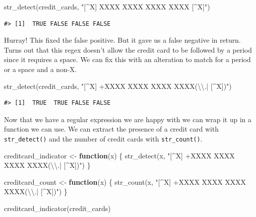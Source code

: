 \documentclass[
]{krantz}
\makeatletter
\newenvironment{Shaded}{\begin{snugshade}}{\end{snugshade}}
\newcommand{\ControlFlowTok}[1]{\textcolor[rgb]{0.13,0.29,0.53}{\textbf{#1}}}
\newcommand{\FunctionTok}[1]{\textcolor[rgb]{0.00,0.00,0.00}{#1}}
\newcommand{\NormalTok}[1]{#1}
\newcommand{\OtherTok}[1]{\textcolor[rgb]{0.56,0.35,0.01}{#1}}
\newcommand{\SpecialCharTok}[1]{\textcolor[rgb]{0.00,0.00,0.00}{#1}}
\newcommand{\StringTok}[1]{\textcolor[rgb]{0.31,0.60,0.02}{#1}}
\newenvironment{kframe}{%
\medskip{}
\setlength{\fboxsep}{.8em}
 \def\at@end@of@kframe{}%
 \ifinner\ifhmode%
  \def\at@end@of@kframe{\end{minipage}}%
  \begin{minipage}{\columnwidth}%
 \fi\fi%
 \def\FrameCommand##1{\hskip\@totalleftmargin \hskip-\fboxsep
 \colorbox{shadecolor}{##1}\hskip-\fboxsep
     \hskip-\linewidth \hskip-\@totalleftmargin \hskip\columnwidth}%
 \MakeFramed {\advance\hsize-\width
   \@totalleftmargin\z@ \linewidth\hsize
   \@setminipage}}%
 {\par\unskip\endMakeFramed%
 \at@end@of@kframe}
\renewenvironment{Shaded}{\begin{kframe}}{\end{kframe}}
\makeatother
\begin{document}
\begin{Shaded}
\begin{Highlighting}[]
\FunctionTok{str\_detect}\NormalTok{(credit\_cards, }\StringTok{"[\^{}X] XXXX XXXX XXXX XXXX [\^{}X]"}\NormalTok{)}
\end{Highlighting}
\end{Shaded}

\begin{verbatim}
#> [1]  TRUE FALSE FALSE FALSE
\end{verbatim}

Hurray! This fixed the false positive.
But it gave us a false negative in return.
Turns out that this regex doesn't allow the credit card to be followed by a period since it requires a space.
We can fix this with an alteration to match for a period or a space and a non-X.

\begin{Shaded}
\begin{Highlighting}[]
\FunctionTok{str\_detect}\NormalTok{(credit\_cards, }\StringTok{"[\^{}X] +XXXX XXXX XXXX XXXX(}\SpecialCharTok{\textbackslash{}\textbackslash{}}\StringTok{.| [\^{}X])"}\NormalTok{)}
\end{Highlighting}
\end{Shaded}

\begin{verbatim}
#> [1]  TRUE  TRUE FALSE FALSE
\end{verbatim}

Now that we have a regular expression we are happy with we can wrap it up in a function we can use.
We can extract the presence of a credit card with \texttt{str\_detect()} and the number of credit cards with \texttt{str\_count()}.

\begin{Shaded}
\begin{Highlighting}[]
\NormalTok{creditcard\_indicator }\OtherTok{\textless{}{-}} \ControlFlowTok{function}\NormalTok{(x) \{}
  \FunctionTok{str\_detect}\NormalTok{(x, }\StringTok{"[\^{}X] +XXXX XXXX XXXX XXXX(}\SpecialCharTok{\textbackslash{}\textbackslash{}}\StringTok{.| [\^{}X])"}\NormalTok{)}
\NormalTok{\}}

\NormalTok{creditcard\_count }\OtherTok{\textless{}{-}} \ControlFlowTok{function}\NormalTok{(x) \{}
  \FunctionTok{str\_count}\NormalTok{(x, }\StringTok{"[\^{}X] +XXXX XXXX XXXX XXXX(}\SpecialCharTok{\textbackslash{}\textbackslash{}}\StringTok{.| [\^{}X])"}\NormalTok{)}
\NormalTok{\}}

\FunctionTok{creditcard\_indicator}\NormalTok{(credit\_cards)}
\end{Highlighting}
\end{Shaded}
\end{document}
